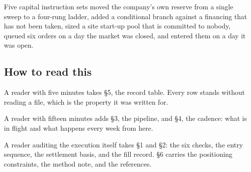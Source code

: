 Five capital instruction sets moved the company's own reserve from a single sweep
to a four-rung ladder, added a conditional branch against a financing that has
not been taken, sized a site start-up pool that is committed to nobody, queued
six orders on a day the market was closed, and entered them on a day it was open.

\subsection{How to read this}

A reader with five minutes takes \S5, the record table. Every row stands without
reading a file, which is the property it was written for.

A reader with fifteen minutes adds \S3, the pipeline, and \S4, the cadence: what
is in flight and what happens every week from here.

A reader auditing the execution itself takes \S1 and \S2: the six checks, the
entry sequence, the settlement basis, and the fill record. \S6 carries the
positioning constraints, the method note, and the references.
